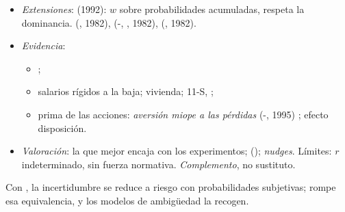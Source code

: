 \documentclass{article}
\begin{document}
\begin{columnas}
\begin{itemize}
\begin{itemize}
  \item {} .
  \end{itemize}
\item \emph{Extensiones}:  (1992): $w$ sobre probabilidades acumuladas, respeta la dominancia.  (, 1982),  (-, , 1982),  (, 1982).
\item \emph{Evidencia}:
  \begin{itemize}
  \item {};
  \item salarios rígidos a la baja; vivienda; 11-S, ;
  \item prima de las acciones: \emph{aversión miope a las pérdidas} (-, 1995) ; efecto disposición.
  \end{itemize}
\item \emph{Valoración}: la que mejor encaja con los experimentos;  (); \emph{nudges}. Límites: $r$ indeterminado, sin fuerza normativa. \emph{Complemento}, no sustituto.
\end{itemize}

\begin{ideaclave}
Con , la incertidumbre se reduce a riesgo con probabilidades subjetivas;  rompe esa equivalencia, y los modelos de ambigüedad la recogen.
\end{ideaclave}


\end{columnas}
\end{document}

